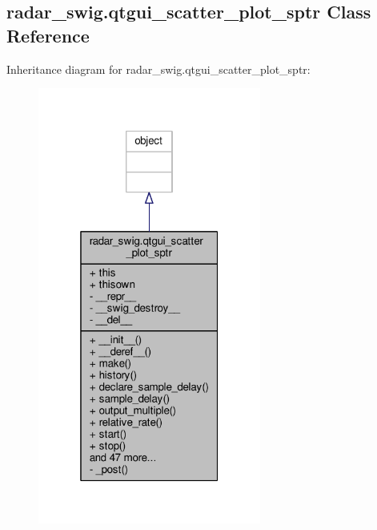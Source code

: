 \subsection{radar\+\_\+swig.\+qtgui\+\_\+scatter\+\_\+plot\+\_\+sptr Class Reference}
\label{classradar__swig_1_1qtgui__scatter__plot__sptr}


Inheritance diagram for radar\+\_\+swig.\+qtgui\+\_\+scatter\+\_\+plot\+\_\+sptr\+:
\nopagebreak
\begin{figure}[H]
\begin{center}
\leavevmode
\includegraphics[width=208pt]{d7/d4c/classradar__swig_1_1qtgui__scatter__plot__sptr__inherit__graph}
\end{center}
\end{figure}


